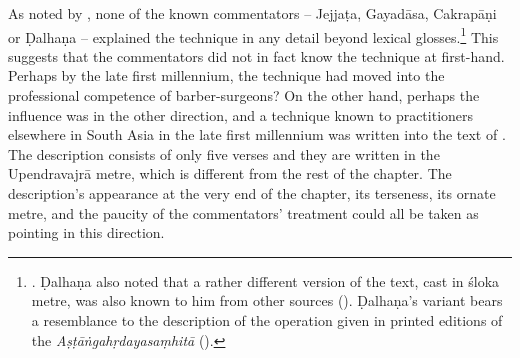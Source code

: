 As noted by \citeauthor{meul-hist}, none of the known commentators -- Jejjaṭa,
Gayadāsa, Cakrapāṇi or Ḍalhaṇa -- explained the technique in any detail beyond
lexical glosses.\footnote{\cite[IB, 328]{meul-hist}. Ḍalhaṇa also noted that a
rather different version of the text, cast in śloka metre, was also known to him
from other sources ().  Ḍalhaṇa's variant bears a 
resemblance
to the description of the operation given in printed editions of the
\emph{Aṣṭāṅgahṛdayasaṃhitā} ().} %
This suggests that the commentators did not in fact know the technique at
first-hand. Perhaps by the late first millennium, the technique had moved into the
professional competence of barber-surgeons?  On the other hand, perhaps the
influence was in the other direction, and a technique known to practitioners
elsewhere in South Asia in the late first millennium was written into the text of
\SS. The description consists of only five verses and they 
are
written in the Upendravajrā metre, which is different from the rest of the
chapter.  The description's appearance at the very end of the chapter, its
terseness, its ornate metre, and the paucity of the commentators' treatment could
all be taken as pointing in this direction.

